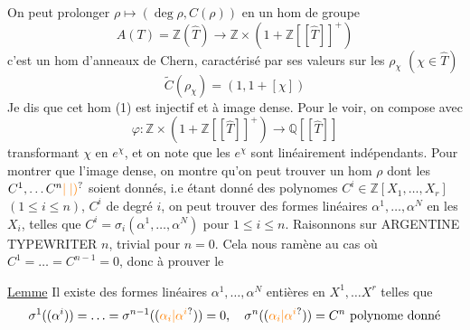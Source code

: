 On peut prolonger $\rho\mapsto(\deg\rho,C(\rho))$ en un hom de groupe
\[
A(T)=\mathbb Z(\widehat T)\longrightarrow\mathbb Z\times(1+\mathbb Z[[\widehat T]]^+) \tag*{(1)}
\]
c'est un hom d'anneaux de Chern, caractérisé par
ses valeurs sur les $\rho_\chi$ $(\chi\in\widehat T)$
\[
\widetilde C(\rho_\chi)=(1,1+[\chi])
\]
Je dis que cet hom (1) est injectif  et à image
dense. Pour le voir, on compose avec \deleted{\unsure{$\varphi$}}
\[
\varphi:\mathbb Z\times(1+\mathbb Z[[\widehat T]]^+)\longrightarrow\mathbb Q[[\widehat T]]
\]
transformant $\chi$ en $e^\chi$, et on note que les
$e^\chi$ sont linéairement indépendants. Pour montrer que
l'image  dense, on montre qu'on peut trouver
un hom $\rho$ dont les $C^1,\ldots C^n\unsure{\mid|)}$ soient donnés,
i.e  étant donné des 
polynomes $C^i\in\mathbb Z[X_1,\ldots,X_r]$ $(1\leq i\leq n)$, $C^i$
de degré $i$, on peut trouver des formes linéaires
$\alpha^1,\ldots,\alpha^N$ en les $X_i$, telles que
$C^i=\sigma_i(\alpha^1,\ldots,\alpha^N)$ pour $1\leq i\leq n$. Raisonnons sur
 ARGENTINE  TYPEWRITER  
$n$, trivial pour $n=0$. Cela nous ramène au cas
où $C^1=\ldots=C^{n-1}=0$, donc à prouver le

\uline{Lemme} Il existe des formes linéaires $\alpha^1,\ldots,\alpha^N$
entières en $X^1,\ldots X^r$ telles que
\[
\sigma^1((\alpha^i))=\ldots=\sigma^{n-1}((\unsure{\alpha_i|\alpha^i}))=0,\quad
\sigma^n((\unsure{\alpha_i|\alpha^i}))=C^n\ \text{polynome donné}
\]


